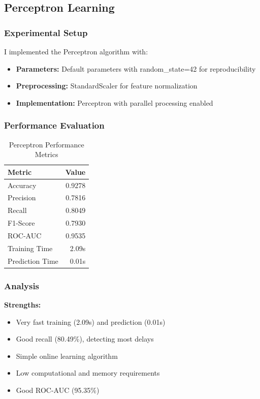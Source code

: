 \documentclass[sigconf]{acmart}
\begin{document}
\subsection{Perceptron Learning}

\subsubsection{Experimental Setup}
I implemented the Perceptron algorithm with:
\begin{itemize}
    \item \textbf{Parameters:} Default parameters with random\_state=42 for reproducibility
    \item \textbf{Preprocessing:} StandardScaler for feature normalization
    \item \textbf{Implementation:} Perceptron with parallel processing enabled
\end{itemize}

\subsubsection{Performance Evaluation}
\begin{table}[h]
\centering
\caption{Perceptron Performance Metrics}
\begin{tabular}{lr}
\toprule
Metric & Value \\
\midrule
Accuracy & 0.9278 \\
Precision & 0.7816 \\
Recall & 0.8049 \\
F1-Score & 0.7930 \\
ROC-AUC & 0.9535 \\
Training Time & 2.09s \\
Prediction Time & 0.01s \\
\bottomrule
\end{tabular}
\end{table}

\subsubsection{Analysis}
\textbf{Strengths:}
\begin{itemize}
    \item Very fast training (2.09s) and prediction (0.01s)
    \item Good recall (80.49\%), detecting most delays
    \item Simple online learning algorithm
    \item Low computational and memory requirements
    \item Good ROC-AUC (95.35\%)
\end{itemize}
\end{document}
